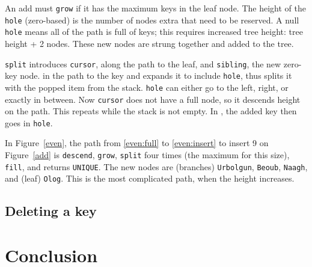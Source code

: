 \documentclass[12pt]{article}
\newcommand{\code}[1]{\colorbox{light-gray}{\texttt{#1}}}
\begin{document}
An add must \code{grow} if it has the maximum keys in the leaf node. The height of the \code{hole} (zero-based) is the number of nodes extra that need to be reserved. A null \code{hole} means all of the path is full of keys; this requires increased tree height: tree height + 2 nodes. These new nodes are strung together and added to the tree.

\code{split} introduces \code{cursor}, along the path to the leaf, and \code{sibling}, the new zero-key node.  in the path to the key and expands it to include \code{hole}, thus splits it with the popped item from the stack. \code{hole} can either go to the left, right, or exactly in between. Now \code{cursor} does not have a full node, so it descends height on the path. This repeats while the stack is not empty. In , the added key then goes in \code{hole}.

In Figure~\ref{even}, the path from \ref{even:full} to \ref{even:insert} to insert 9 on Figure~\ref{add} is \code{descend}, \code{grow}, \code{split} four times (the maximum for this size), \code{fill}, and returns \code{UNIQUE}. The new nodes are (branches) \code{Urbolgun}, \code{Beoub}, \code{Naagh}, and (leaf) \code{Olog}. This is the most complicated path, when the height increases.

\subsection{Deleting a key}



\section{Conclusion}


\end{document}
